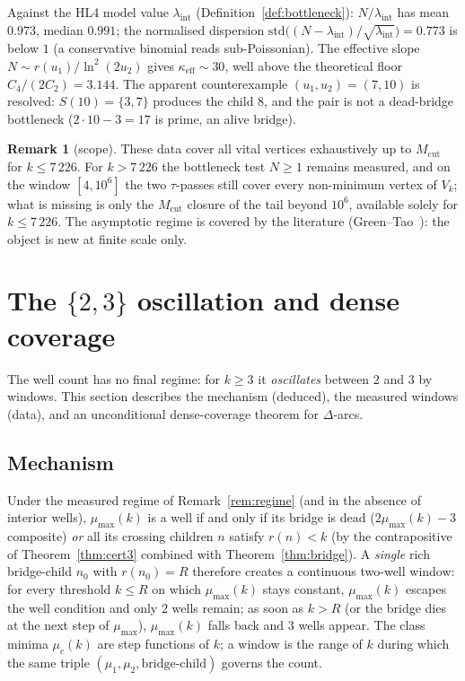 \documentclass[11pt]{article}
\theoremstyle{plain}
\theoremstyle{definition}
\newtheorem{remark}[theorem]{Remark}
\newcommand{\rays}{S}
\newcommand{\rch}{r}
\newcommand{\Vk}{V_{k}}
\newcommand{\Mcut}{M_{\mathrm{cut}}}
\newcommand{\lam}{\lambda_{\mathrm{int}}}
\begin{document}
Against the HL4 model value $\lam$ (Definition~\ref{def:bottleneck}):
$N/\lam$ has mean $0.973$, median $0.991$; the normalised
dispersion $\mathrm{std}\bigl((N-\lam)/\sqrt{\lam}\bigr) = 0.773$ is
below $1$ (a conservative binomial reads sub-Poissonian). The
effective slope $N \sim \rch(u_1)/\ln^{2}(2u_2)$ gives
$\kappa_{\mathrm{eff}} \sim 30$, well above the theoretical floor
$C_4/(2C_2) = 3.144$. The apparent counterexample $(u_1,u_2) = (7,10)$
is resolved: $\rays(10) = \{3,7\}$ produces the child $8$, and the
pair is not a dead-bridge bottleneck ($2\cdot 10 - 3 = 17$ is
prime, an alive bridge).

\begin{remark}[scope]\label{rem:scope}
These data cover all vital vertices exhaustively up to $\Mcut$ for
$k \le 7\,226$. For $k > 7\,226$ the bottleneck test $N \ge 1$
remains measured, and on the window $[4,10^{6}]$ the two
$\tau$-passes still cover every non-minimum vertex of $\Vk$; what
is missing is only the $\Mcut$ closure of the tail beyond $10^{6}$,
available solely for $k \le 7\,226$. The asymptotic regime is
covered by the literature (Green--Tao~\cite{greentao}): the object
is new at finite scale only.
\end{remark}

\section{The \texorpdfstring{$\{2,3\}$}{\{2,3\}} oscillation and dense coverage}
\label{sec:osc}

The well count has no final regime: for $k \ge 3$ it
\emph{oscillates} between $2$ and $3$ by windows. This section
describes the mechanism (deduced), the measured windows (data), and
an unconditional dense-coverage theorem for $\Delta$-arcs.

\subsection{Mechanism}

Under the measured regime of Remark~\ref{rem:regime} (and in the
absence of interior wells), $\mu_{\max}(k)$ is a well if and only if
its bridge is dead ($2\mu_{\max}(k)-3$ composite) \emph{or} all its
crossing children $n$ satisfy $\rch(n) < k$ (by the contrapositive of Theorem~\ref{thm:cert3}
combined with Theorem~\ref{thm:bridge}). A \emph{single}
rich bridge-child $n_0$ with $\rch(n_0) = R$ therefore creates a
continuous two-well window: for every threshold $k \le R$ on which
$\mu_{\max}(k)$ stays constant, $\mu_{\max}(k)$ escapes the well
condition and only $2$ wells remain; as soon as $k > R$ (or the
bridge dies at the next step of $\mu_{\max}$), $\mu_{\max}(k)$ falls
back and $3$ wells appear. The class minima $\mu_c(k)$ are step
functions of $k$; a window is the range of $k$ during which the same
triple $(\mu_1,\mu_2,\text{bridge-child})$ governs the count.
\end{document}
